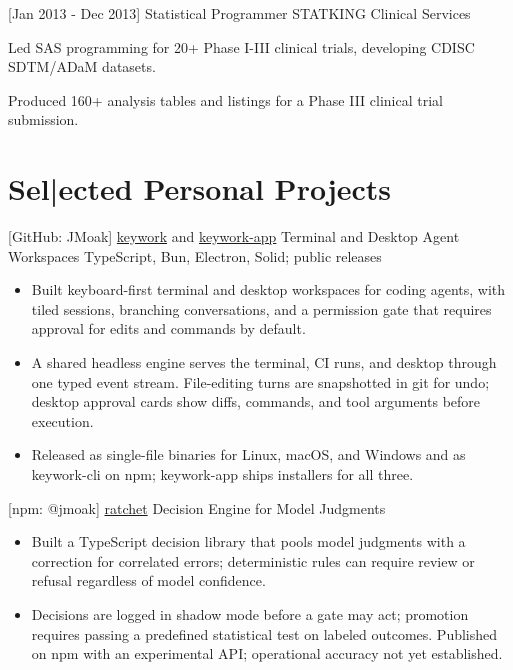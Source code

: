 \documentclass[]{moak-resume}
\begin{document}
\begin{entrylist}
    \experienceentry
    {[Jan 2013 - Dec 2013]}
    {Statistical Programmer}
    {STATKING Clinical Services}
    {}
  \end{entrylist}
\begin{experienceitems}
  \item Led SAS programming for 20+ Phase I-III clinical trials, developing CDISC SDTM/ADaM datasets.
  \item Produced 160+ analysis tables and listings for a Phase III clinical trial submission.
\end{experienceitems}


\section{Sel|ected Personal Projects}
\begin{entrylist}
  \entry
    {[GitHub: JMoak]}
    {\href{https://github.com/JMoak/keywork}{keywork} and \href{https://github.com/JMoak/keywork-app}{keywork-app}}
    {Terminal and Desktop Agent Workspaces}
    {TypeScript, Bun, Electron, Solid; public releases}
\end{entrylist}
\begin{itemize}
  \item Built keyboard-first terminal and desktop workspaces for coding agents, with tiled sessions, branching conversations, and a permission gate that requires approval for edits and commands by default.
  \item A shared headless engine serves the terminal, CI runs, and desktop through one typed event stream. File-editing turns are snapshotted in git for undo; desktop approval cards show diffs, commands, and tool arguments before execution.
  \item Released as single-file binaries for Linux, macOS, and Windows and as keywork-cli on npm; keywork-app ships installers for all three.
\end{itemize}

\begin{entrylist}
  \entry
    {[npm: @jmoak]}
    {\href{https://github.com/JMoak/ratchet}{ratchet}}
    {Decision Engine for Model Judgments}
    {}
\end{entrylist}
\begin{itemize}
  \item Built a TypeScript decision library that pools model judgments with a correction for correlated errors; deterministic rules can require review or refusal regardless of model confidence.
  \item Decisions are logged in shadow mode before a gate may act; promotion requires passing a predefined statistical test on labeled outcomes. Published on npm with an experimental API; operational accuracy not yet established.
\end{itemize}
\end{document}
